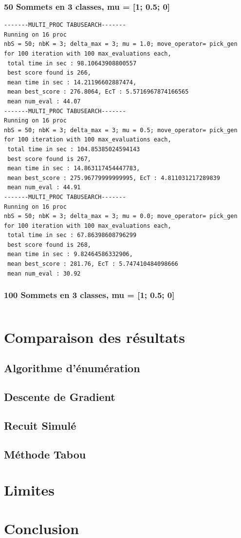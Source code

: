 \documentclass[a4paper]{article}
\begin{document}
\subsubsection{50 Sommets en 3 classes, mu = [1; 0.5; 0]}
\begin{verbatim}
-------MULTI_PROC TABUSEARCH-------
Running on 16 proc
nbS = 50; nbK = 3; delta_max = 3; mu = 1.0; move_operator= pick_gen
for 100 iteration with 100 max_evaluations each, 
 total time in sec : 98.10643908800557
 best score found is 266,
 mean time in sec : 14.21196602887474,
 mean best_score : 276.8064, EcT : 5.5716967874166565
 mean num_eval : 44.07
-------MULTI_PROC TABUSEARCH-------
Running on 16 proc
nbS = 50; nbK = 3; delta_max = 3; mu = 0.5; move_operator= pick_gen
for 100 iteration with 100 max_evaluations each, 
 total time in sec : 104.85385024594143
 best score found is 267,
 mean time in sec : 14.863117454447783,
 mean best_score : 275.96779999999995, EcT : 4.811031217289839
 mean num_eval : 44.91
-------MULTI_PROC TABUSEARCH-------
Running on 16 proc
nbS = 50; nbK = 3; delta_max = 3; mu = 0.0; move_operator= pick_gen
for 100 iteration with 100 max_evaluations each, 
 total time in sec : 67.86398608796299
 best score found is 268,
 mean time in sec : 9.82464586332906,
 mean best_score : 281.76, EcT : 5.747410484098666
 mean num_eval : 30.92
\end{verbatim}
\subsubsection{100 Sommets en 3 classes, mu = [1; 0.5; 0]}
\begin{verbatim}

\end{verbatim}

\section{Comparaison des résultats}

\subsection{Algorithme d'énumération}

\subsection{Descente de Gradient}

\subsection{Recuit Simulé}

\subsection{Méthode Tabou}

\section{Limites}

\section{Conclusion}
\end{document}
